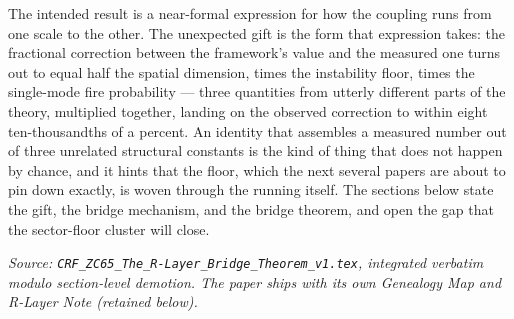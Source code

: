 \documentclass[12pt, a4paper]{article}
\begin{document}
The intended result is a near-formal expression for how the coupling runs from
one scale to the other. The unexpected gift is the form that expression takes:
the fractional correction between the framework's value and the measured one
turns out to equal half the spatial dimension, times the instability floor,
times the single-mode fire probability --- three quantities from utterly
different parts of the theory, multiplied together, landing on the observed
correction to within eight ten-thousandths of a percent. An identity that
assembles a measured number out of three unrelated structural constants is the
kind of thing that does not happen by chance, and it hints that the floor,
which the next several papers are about to pin down exactly, is woven through the
running itself. The sections below state the gift, the bridge mechanism, and the
bridge theorem, and open the gap that the sector-floor cluster will close.
\label{sec:zc65}

\noindent
\textit{Source: \texttt{CRF\_ZC65\_The\_R-Layer\_Bridge\_Theorem\_v1.tex}, integrated verbatim modulo
section-level demotion. The paper ships with its own Genealogy Map
and R-Layer Note (retained below).}

\medskip
\end{document}
